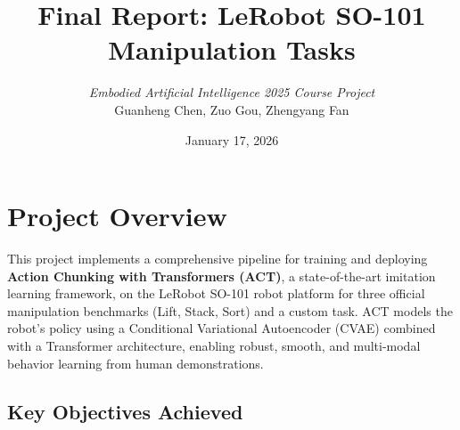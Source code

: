 \documentclass[10pt]{article} %
\title{\textbf{Final Report: LeRobot SO-101 Manipulation Tasks}}
\author{
  \textit{Embodied Artificial Intelligence 2025 Course Project} \\
  Guanheng Chen, Zuo Gou, Zhengyang Fan 
}
\date{January 17, 2026} %
\begin{document}
\maketitle
\vspace{-1em}

\hypersetup{linkcolor=black}
\tableofcontents
\newpage

\section{Project Overview}

This project implements a comprehensive pipeline for training and deploying \textbf{Action Chunking with Transformers (ACT)}, a state-of-the-art imitation learning framework, on the LeRobot SO-101 robot platform for three official manipulation benchmarks (Lift, Stack, Sort) and a custom task. ACT models the robot's policy using a Conditional Variational Autoencoder (CVAE) combined with a Transformer architecture, enabling robust, smooth, and multi-modal behavior learning from human demonstrations.

\subsection{Key Objectives Achieved}
\end{document}
